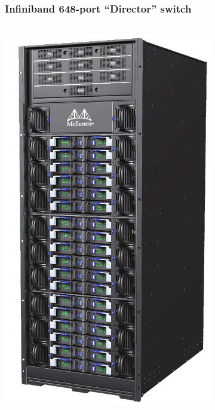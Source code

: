 \documentclass[xcolor={rgb,x11names,svgnames},rgb,x11names,svgnames]{beamer}
\begin{document}

\begin{frame}
  \frametitle{Infiniband 648-port ``Director'' switch }
  \begin{columns}
    \begin{column}{0.3\textwidth}
      \includegraphics[height=0.75\textheight]{infiniband.png}


\end{column}
\end{columns}
\end{frame}
\end{document}
